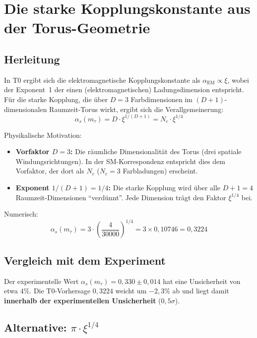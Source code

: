 	
	\section{Die starke Kopplungskonstante aus der Torus-Geometrie}
	\label{sec:alpha_s}
	
	\subsection{Herleitung}
	
	In T0 ergibt sich die elektromagnetische Kopplungskonstante als $\alpha_\text{EM} \propto \xi$, wobei der Exponent~1 der einen (elektromagnetischen) Ladungsdimension entspricht. Für die starke Kopplung, die über $D = 3$ Farbdimensionen im $(D+1)$-dimensionalen Raumzeit-Torus wirkt, ergibt sich die Verallgemeinerung:
	\begin{equation}
		\alpha_s(m_\tau) = D \cdot \xi^{1/(D+1)} = N_c \cdot \xi^{1/4}
	\end{equation}
	
	Physikalische Motivation:
	\begin{itemize}
		\item \textbf{Vorfaktor $D = 3$:} Die räumliche Dimensionalität des Torus (drei spatiale Windungsrichtungen). In der SM-Korrespondenz entspricht dies dem Vorfaktor, der dort als $N_c$ ($N_c=3$ Farbladungen) erscheint.
		\item \textbf{Exponent $1/(D+1) = 1/4$:} Die starke Kopplung wird über alle $D+1 = 4$ Raumzeit-Dimensionen ``verdünnt''. Jede Dimension trägt den Faktor $\xi^{1/4}$ bei.
	\end{itemize}
	
	Numerisch:
	\begin{equation}
		\alpha_s(m_\tau) = 3 \cdot \left(\frac{4}{30000}\right)^{1/4} = 3 \times 0{,}10746 = 0{,}3224
	\end{equation}
	
	\subsection{Vergleich mit dem Experiment}
	
	Der experimentelle Wert $\alpha_s(m_\tau) = 0{,}330 \pm 0{,}014$ hat eine Unsicherheit von etwa $4\%$. Die T0-Vorhersage $0{,}3224$ weicht um $-2{,}3\%$ ab und liegt damit \textbf{innerhalb der experimentellen Unsicherheit} ($0{,}5\sigma$).
	
	\subsection{Alternative: $\pi \cdot \xi^{1/4}$}
	
